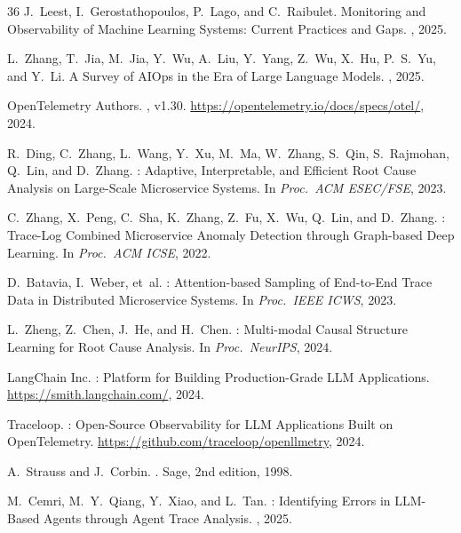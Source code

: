 \documentclass[sigplan,10pt,screen]{acmart}
\begin{document}
\begin{thebibliography}{36}
J.~Leest, I.~Gerostathopoulos, P.~Lago, and C.~Raibulet.
\newblock Monitoring and Observability of Machine Learning Systems: Current
  Practices and Gaps.
, 2025.

L.~Zhang, T.~Jia, M.~Jia, Y.~Wu, A.~Liu, Y.~Yang, Z.~Wu, X.~Hu, P.~S.~Yu,
  and Y.~Li.
\newblock A Survey of {AIOps} in the Era of Large Language Models.
, 2025.

{OpenTelemetry Authors}.
, v1.30.
\newblock \url{https://opentelemetry.io/docs/specs/otel/}, 2024.

R.~Ding, C.~Zhang, L.~Wang, Y.~Xu, M.~Ma, W.~Zhang, S.~Qin, S.~Rajmohan,
  Q.~Lin, and D.~Zhang.
: Adaptive, Interpretable, and Efficient Root Cause
  Analysis on Large-Scale Microservice Systems.
\newblock In {\em Proc.\ ACM ESEC/FSE}, 2023.

C.~Zhang, X.~Peng, C.~Sha, K.~Zhang, Z.~Fu, X.~Wu, Q.~Lin, and D.~Zhang.
: Trace-Log Combined Microservice Anomaly Detection
  through Graph-based Deep Learning.
\newblock In {\em Proc.\ ACM ICSE}, 2022.

D.~Batavia, I.~Weber, et~al.
: Attention-based Sampling of End-to-End Trace Data in
  Distributed Microservice Systems.
\newblock In {\em Proc.\ IEEE ICWS}, 2023.

L.~Zheng, Z.~Chen, J.~He, and H.~Chen.
: Multi-modal Causal Structure Learning for Root Cause
  Analysis.
\newblock In {\em Proc.\ NeurIPS}, 2024.

{LangChain Inc.}
: Platform for Building Production-Grade {LLM} Applications.
\newblock \url{https://smith.langchain.com/}, 2024.

{Traceloop}.
: Open-Source Observability for {LLM} Applications
  Built on {OpenTelemetry}.
\newblock \url{https://github.com/traceloop/openllmetry}, 2024.

A.~Strauss and J.~Corbin.
.
\newblock Sage, 2nd edition, 1998.

M.~Cemri, M.~Y.~Qiang, Y.~Xiao, and L.~Tan.
: Identifying Errors in {LLM}-Based Agents through
  Agent Trace Analysis.
, 2025.


\end{thebibliography}
\end{document}
